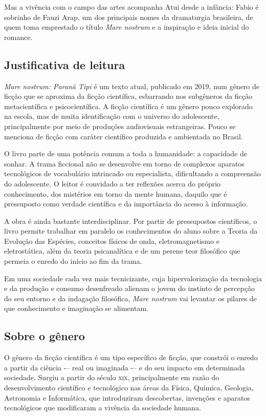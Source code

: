 \documentclass[12pt]{extarticle}
\begin{document}
Mas a vivência com o campo das artes acompanha Atui desde a infância: Fabio é sobrinho de Fauzi Arap, um dos principais nomes da dramaturgia brasileira, de quem toma emprestado o título \emph{Mare nostrum} e a inspiração e ideia inicial do romance.

\subsection{Justificativa de leitura}
\textit{Mare nostrum: Paranã Tipi} é um texto atual, publicado em 2019, num
gênero de ficção que se aproxima da ficção científica, esbarrando nos
subgêneros da ficção metacientífica e psicocientífica. A ficção científica é um
gênero pouco explorado na escola, mas de muita identificação com o universo do
adolescente, principalmente por meio de produções audiovisuais estrangeiras.
Pouco se menciona de ficção com caráter científico produzida e ambientada no
Brasil.

O livro parte de uma potência comum a toda a humanidade: a capacidade de
sonhar. A trama ficcional não se desenvolve em torno de complexos aparatos
tecnológicos de vocabulário intrincado ou especialista, dificultando a
compreensão do adolescente. O leitor é convidado a ter reflexões acerca do próprio
conhecimento, dos mistérios em torno da mente humana, daquilo que é pressuposto
como verdade científica e da importância do acesso à informação.

A obra é ainda bastante interdisciplinar. Por partir de pressupostos
científicos, o livro permite trabalhar em paralelo os conhecimentos do aluno
sobre a Teoria da Evolução das Espécies, conceitos físicos de onda, eletromagnetismo 
e eletrostática, além da teoria psicanalítica e de um perene teor
filosófico que permeia o enredo do início ao fim da trama.

Em uma sociedade cada vez mais tecnicizante, cuja hipervalorização da
tecnologia e da produção e consumo desenfreado alienam o jovem do instinto de
percepção do seu entorno e da indagação filosófica, 
\emph{Mare nostrum} vai levantar os pilares de que conhecimento e imaginação se alimentam.

\subsection{Sobre o gênero}
O gênero da ficção científica é um tipo específico de ficção, que constrói o
enredo a partir da ciência -– real ou imaginada -– e do seu impacto em
determinada sociedade. Surgiu a partir do século \textsc{xix}, principalmente em razão
do desenvolvimento científico e tecnológico nas áreas da Física, Química,
Geologia, Astronomia e Informática, que introduziram descobertas, invenções e
aparatos tecnológicos que modificaram a vivência da sociedade humana.
\end{document}
